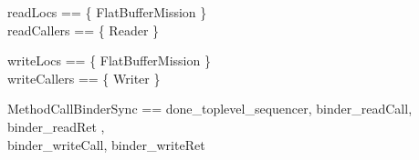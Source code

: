 

%
\begin{zed}
readLocs == \{ FlatBufferMission \}  \\
readCallers == \{ Reader \}
\end{zed}
%
%
\begin{zed}
writeLocs == \{ FlatBufferMission \}  \\
writeCallers == \{ Writer \}
\end{zed}
%

\begin{circus}
\circchannelset MethodCallBinderSync == \lchanset done\_toplevel\_sequencer,
binder\_readCall, binder\_readRet
,\\
binder\_writeCall, binder\_writeRet

\rchanset
\end{circus}
